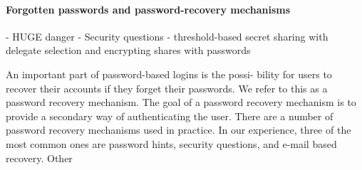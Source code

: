 \paragraph{Forgotten passwords and password-recovery mechanisms}
  - HUGE danger
  - Security questions
  - threshold-based secret sharing with delegate selection and encrypting
  shares with passwords



An important part of password-based logins is the possi-
 bility for users to recover their accounts if they forget their
 passwords. We refer to this as a password recovery mechanism.
 The goal of a password recovery mechanism is to provide a
 secondary way of authenticating the user. There are a number
 of password recovery mechanisms used in practice. In our
 experience, three of the most common ones are password
 hints, security questions, and e-mail based recovery. Other

